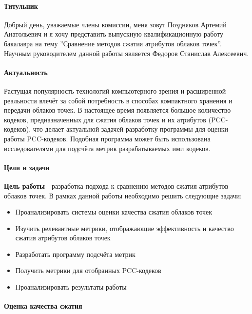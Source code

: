 \documentclass[a4paper,12pt]{extreport}
\begin{document}
\paragraph{Титульник}

Добрый день, уважаемые члены комиссии, меня зовут Поздняков Артемий Анатольевич
и я хочу представить выпускную квалификационную работу бакалавра на тему
''Сравнение методов сжатия атрибутов облаков точек''. Научным руководителем
данной работы является Федоров Станислав Алексеевич.

\paragraph{Актуальность}

Растущая популярность технологий компьютерного зрения и расширенной реальности
влечёт за собой потребность в способах компактного хранения и передачи облаков
точек. В настоящее время появляется большое количество кодеков, предназначенных
для сжатия облаков точек и их атрибутов (PCC-кодеков), что делает актуальной
задачей разработку программы для оценки работы PCC-кодеков. Подобная программа
может быть использована исследователями для подсчёта метрик разрабатываемых ими
кодеков.

\paragraph{Цели и задачи}

\textbf{Цель работы} - разработка подхода к сравнению методов сжатия атрибутов
облаков точек. В рамках данной работы необходимо решить следующие задачи:

\begin{itemize}
    \item Проанализировать системы оценки качества сжатия облаков точек
    \item Изучить релевантные метрики, отображающие эффективность и качество
    сжатия атрибутов облаков точек
    \item Разработать программу подсчёта метрик
    \item Получить метрики для отобранных PCC-кодеков
    \item Проанализировать результаты работы
\end{itemize}

\paragraph{Оценка качества сжатия}
\end{document}
